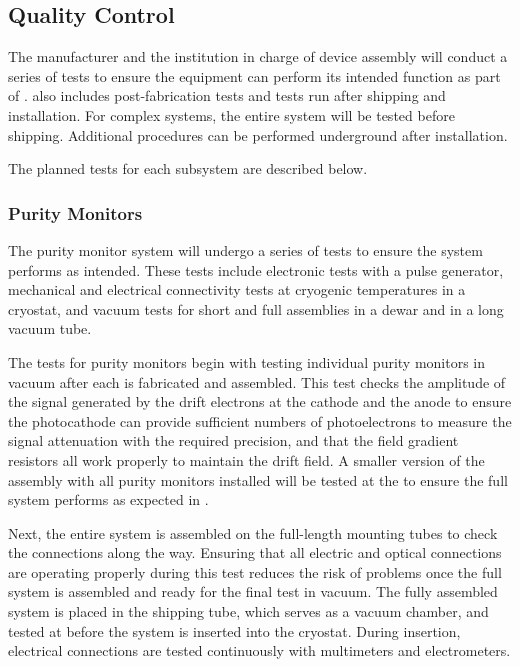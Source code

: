 \subsection{Quality Control}
\label{sec:fdsp-slow-cryo-qc}
The manufacturer and the institution in charge of device assembly will conduct a series of tests to ensure the equipment can perform its intended function as part of .  also includes post-fabrication tests and tests run after shipping and installation. For complex systems, the entire system will be tested before shipping. 
Additional  procedures can be performed %
underground after installation. %

The planned tests for each subsystem are described below.  


\subsubsection{Purity Monitors}
\label{sec:fdgen-slow-cryo-qc-pm}


The purity monitor system will undergo a series of tests to ensure the
system performs as intended. These tests 
include electronic tests
with a pulse generator, mechanical and electrical connectivity tests
at cryogenic temperatures in a cryostat, and vacuum tests for short
and full assemblies in a dewar and in a long vacuum tube.

The  tests for  purity monitors begin with testing
individual purity monitors in vacuum after each is fabricated and
assembled.  This test checks the amplitude of the signal generated by
the drift electrons at the cathode and the anode to ensure the
photocathode can provide sufficient numbers of photoelectrons to
measure the signal attenuation
with the required precision, and that the field gradient resistors all work properly to maintain the drift field. %
A smaller version of the assembly with all purity monitors installed will be  tested at the  %
to ensure the full system performs as expected in .  

Next, %
the entire system %
is assembled on the full-length mounting tubes to check the connections along the way.  Ensuring that all electric and optical connections are operating properly during this test reduces the risk of problems once the full system is assembled and ready for the final test in vacuum.  %
The fully assembled system %
is placed in the shipping tube, which %
serves as a vacuum chamber, and tested at  %
 before the system is inserted into the  %
 cryostat. During insertion, electrical connections %
 are tested continuously with multimeters and electrometers.



